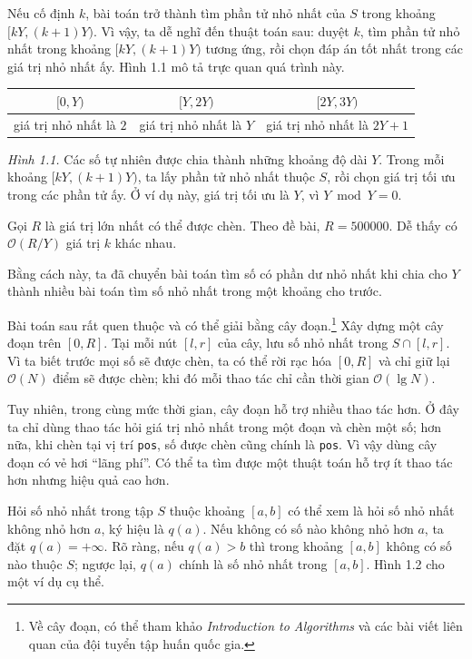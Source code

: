 \documentclass[11pt]{article}
\newcommand{\Oh}{\mathcal{O}}
\begin{document}
Nếu cố định $k$, bài toán trở thành tìm phần tử nhỏ nhất của $S$ trong khoảng
$[kY,(k+1)Y)$. Vì vậy, ta dễ nghĩ đến thuật toán sau: duyệt $k$, tìm phần tử
nhỏ nhất trong khoảng $[kY,(k+1)Y)$ tương ứng, rồi chọn đáp án tốt nhất trong
các giá trị nhỏ nhất ấy. Hình 1.1 mô tả trực quan quá trình này.

\begin{center}
\small
\begin{tabular}{c|c|c}
$[0,Y)$ & $[Y,2Y)$ & $[2Y,3Y)$ \\
\hline
giá trị nhỏ nhất là $2$ & giá trị nhỏ nhất là $Y$ &
giá trị nhỏ nhất là $2Y+1$
\end{tabular}

\textit{Hình 1.1.} Các số tự nhiên được chia thành những khoảng độ dài $Y$.
Trong mỗi khoảng $[kY,(k+1)Y)$, ta lấy phần tử nhỏ nhất thuộc $S$, rồi chọn
giá trị tối ưu trong các phần tử ấy. Ở ví dụ này, giá trị tối ưu là $Y$, vì
$Y\bmod Y=0$.
\end{center}

Gọi $R$ là giá trị lớn nhất có thể được chèn. Theo đề bài, $R=500000$. Dễ thấy
có $\Oh(R/Y)$ giá trị $k$ khác nhau.

Bằng cách này, ta đã chuyển bài toán tìm số có phần dư nhỏ nhất khi chia cho
$Y$ thành nhiều bài toán tìm số nhỏ nhất trong một khoảng cho trước.

Bài toán sau rất quen thuộc và có thể giải bằng cây đoạn.\footnote{Về cây
đoạn, có thể tham khảo \textit{Introduction to Algorithms} và các bài viết
liên quan của đội tuyển tập huấn quốc gia.} Xây dựng một cây đoạn trên
$[0,R]$. Tại mỗi nút $[l,r]$ của cây, lưu số nhỏ nhất trong $S\cap [l,r]$. Vì
ta biết trước mọi số sẽ được chèn, ta có thể rời rạc hóa $[0,R]$ và chỉ giữ
lại $\Oh(N)$ điểm sẽ được chèn; khi đó mỗi thao tác chỉ cần thời gian
$\Oh(\lg N)$.

Tuy nhiên, trong cùng mức thời gian, cây đoạn hỗ trợ nhiều thao tác hơn. Ở đây
ta chỉ dùng thao tác hỏi giá trị nhỏ nhất trong một đoạn và chèn một số; hơn
nữa, khi chèn tại vị trí \texttt{pos}, số được chèn cũng chính là
\texttt{pos}. Vì vậy dùng cây đoạn có vẻ hơi ``lãng phí''. Có thể ta tìm được
một thuật toán hỗ trợ ít thao tác hơn nhưng hiệu quả cao hơn.

Hỏi số nhỏ nhất trong tập $S$ thuộc khoảng $[a,b]$ có thể xem là hỏi số nhỏ
nhất không nhỏ hơn $a$, ký hiệu là $q(a)$. Nếu không có số nào không nhỏ hơn
$a$, ta đặt $q(a)=+\infty$. Rõ ràng, nếu $q(a)>b$ thì trong khoảng $[a,b]$
không có số nào thuộc $S$; ngược lại, $q(a)$ chính là số nhỏ nhất trong
$[a,b]$. Hình 1.2 cho một ví dụ cụ thể.
\end{document}
